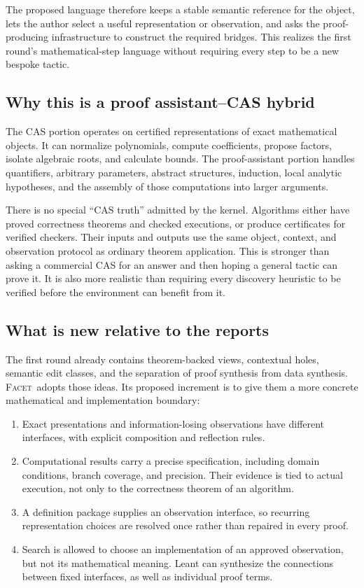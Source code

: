 \documentclass[11pt,a4paper]{article}
\newcommand{\Facet}{\textsc{Facet}}
\theoremstyle{definition}
\begin{document}
The proposed language therefore keeps a stable semantic reference for the object,
lets the author select a useful representation or observation, and asks the
proof-producing infrastructure to construct the required bridges. This realizes
the first round's mathematical-step language without requiring every step to be
a new bespoke tactic.

\subsection{Why this is a proof assistant--CAS hybrid}
The CAS portion operates on certified representations of exact mathematical
objects. It can normalize polynomials, compute coefficients, propose factors,
isolate algebraic roots, and calculate bounds. The proof-assistant portion handles
quantifiers, arbitrary parameters, abstract structures, induction, local analytic
hypotheses, and the assembly of those computations into larger arguments.

There is no special ``CAS truth'' admitted by the kernel. Algorithms either have
proved correctness theorems and checked executions, or produce certificates for
verified checkers. Their inputs and outputs use the same object, context, and
observation protocol as ordinary theorem application. This is stronger than
asking a commercial CAS for an answer and then hoping a general tactic can prove
it. It is also more realistic than requiring every discovery heuristic to be
verified before the environment can benefit from it.

\subsection{What is new relative to the reports}
The first round already contains theorem-backed views, contextual holes,
semantic edit classes, and the separation of proof synthesis from data synthesis.
\Facet\ adopts those ideas. Its proposed increment is to give them a more concrete
mathematical and implementation boundary:

\begin{enumerate}
\item Exact presentations and information-losing observations have different
  interfaces, with explicit composition and reflection rules.
\item Computational results carry a precise specification, including domain
  conditions, branch coverage, and precision. Their evidence is tied to actual
  execution, not only to the correctness theorem of an algorithm.
\item A definition package supplies an observation interface, so recurring
  representation choices are resolved once rather than repaired in every proof.
\item Search is allowed to choose an implementation of an approved observation,
  but not its mathematical meaning. Leant can synthesize the connections between
  fixed interfaces, as well as individual proof terms.
\end{enumerate}
\end{document}
